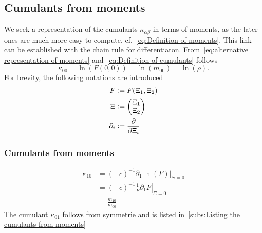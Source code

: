 \documentclass{article}
\begin{document}
\subsection{Cumulants from moments}
\label{sub:Cumulants from moments}

We seek a representation of the cumulants $\kappa_{\alpha\beta}$ in terms of moments, as the later ones are much more easy to compute, cf.~\eqref{eq:Definition of moments}. This link can be established with the chain rule for differentiaton.
From~\eqref{eq:alternative representation of moments} and~\eqref{eq:Definition of cumulants} follows
\begin{equation}
  \kappa_{00} = \ln(F(0,0)) = \ln(m_{00}) = \ln(\rho).
\end{equation}
For brevity, the following notations are introduced
\begin{equation}
  \label{eq:abbreviations for deriving cumulants from moments}
  \begin{aligned}
    F & \mathrel{\mathop:}= F(\Xi_1, \Xi_2) \\
    \Xi &\mathrel{\mathop:}= \begin{pmatrix}\Xi_1 \\ \Xi_2  \end{pmatrix} \\
    \partial_i &\mathrel{\mathop:}= \frac{\partial}{\partial \Xi_i}
  \end{aligned}
\end{equation}

\subsubsection{Cumulants from moments}
\label{subs:Cumulants from moments}

\begin{equation*}
  \begin{aligned}
    \kappa_{10} & = {(-c)}^{-1} \left.\partial_1 \ln(F) \right|_{\Xi = 0} \\
    & = {(-c)}^{-1} \left. \frac{1}{F} \partial_1 F \right|_{\Xi = 0} \\
    & = \frac{m_{10}}{m_{00}}
  \end{aligned}
\end{equation*}
The cumulant $\kappa_{01}$ follows from symmetrie and is listed in~\ref{subs:Listing the cumulants from moments}
\end{document}
